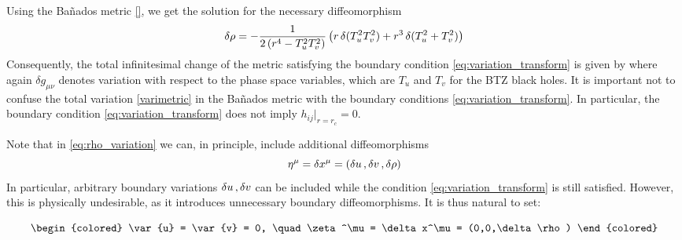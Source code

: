 \documentclass[12pt,a4paper,utf8]{article}
\begin{document}
Using the Ba\~nados metric \eqref{}, 
we get the solution for the %
necessary diffeomorphism
\begin{equation}
			\mathinner{\delta \rho}
		= -\frac{1}{2\,(r^4 - T_u^2 T_v^2)}
			\left(
				r \mathinner{\delta (T_u^2 T_v^2)}
				+ r^3 \mathinner{\delta (T_u^2 + T_v^2)}
			\right)
	\label{eq:rho_variation}
	\end{equation}
Consequently, the total infinitesimal change of the metric satisfying the boundary condition \eqref{eq:variation_transform}  is given by
where again $\delta g_{\mu\nu}$ denotes variation with respect to the phase space variables, which are $T_u$ and $T_v$ for the BTZ black holes. 
It is important not to confuse the total variation \eqref{varimetric} in the Ba\~nados metric with the boundary conditions \eqref{eq:variation_transform}.
In particular, the boundary condition \eqref{eq:variation_transform} does not imply $h_{ij}|_{r=r_c}=0$. %
	
\begin{colored}
	Note that in \eqref{eq:rho_variation} we can, in principle, include additional diffeomorphisms
	\begin{equation}
		\eta^\mu = \delta x^\mu
		= (\mathinner{\delta u},\mathinner{\delta v},\delta\rho)
	\end{equation}
	In particular, arbitrary boundary variations $\mathinner{\delta u},\mathinner{\delta v}$ can be included while the condition \eqref{eq:variation_transform} is still satisfied. However, this is physically undesirable, as it introduces unnecessary boundary diffeomorphisms. It is thus natural to set:
\end{colored}
	\begin{equation}
\begin{colored}
		\var{u} = \var{v} = 0,
	\quad
		\zeta^\mu = \delta x^\mu
		= (0,0,\delta\rho)
\end{colored}
	\end{equation}
	
\end{document}
